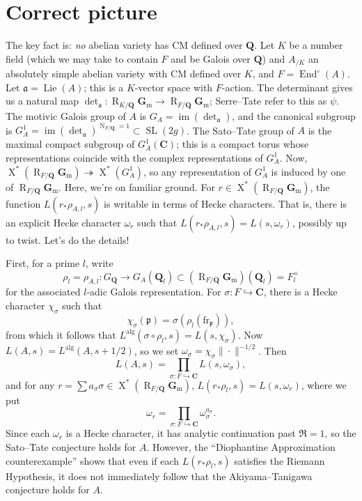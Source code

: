 \documentclass{article}
\DeclareMathOperator{\End}{End}
\DeclareMathOperator{\im}{im}
\DeclareMathOperator{\Lie}{Lie}
\DeclareMathOperator{\N}{N}
\DeclareMathOperator{\R}{R}
\DeclareMathOperator{\SL}{SL}
\DeclareMathOperator{\X}{X}
\newcommand{\bC}{\mathbf{C}}
\newcommand{\Gm}{\mathbf{G}_\mathrm{m}}
\newcommand{\bQ}{\mathbf{Q}}
\newcommand{\fa}{\mathfrak{a}}
\newcommand{\fp}{\mathfrak{p}}
\newcommand{\alg}{\mathrm{alg}}
\newcommand{\frob}{\mathrm{fr}}
\begin{document}
\section{Correct picture}

The key fact is: \emph{no} abelian variety has CM defined over $\bQ$. Let 
$K$ be a number field (which we may take to contain $F$ and be Galois over 
$\bQ$) and $A_{/K}$ an absolutely simple abelian variety with CM defined over 
$K$, and $F = \End^\circ(A)$. Let $\fa = \Lie(A)$; this is a $K$-vector space 
with $F$-action. The determinant gives us a natural map 
$\det_\fa\colon \R_{K/\bQ} \Gm \to \R_{F/\bQ} \Gm$; Serre--Tate refer to this 
as $\psi$. The motivic Galois group of $A$ is $G_A = \im(\det_\fa)$, and the 
canonical subgroup is $G_A^1 = \im(\det_\fa)^{\N_{F/\bQ} = 1}\subset \SL(2g)$. 
The Sato--Tate group of $A$ is the maximal compact subgroup of $G_A^1(\bC)$; 
this is a compact torus whose representations coincide with the complex 
representations of $G_A^1$. Now, 
$\X^\ast(\R_{F/\bQ} \Gm) \twoheadrightarrow \X^\ast(G_A^1)$, so any 
representation of $G_A^1$ is induced by one of $\R_{F/\bQ}\Gm$. Here, we're on 
familiar ground. For $r\in \X^\ast(\R_{F/\bQ}\Gm)$, the function 
$L(r_\ast \rho_{A,l},s)$ is writable in terms of Hecke characters. That is, 
there is an explicit Hecke character $\omega_r$ such that 
$L(r_\ast \rho_{A,l},s) = L(s,\omega_r)$, possibly up to twist. Let's do the 
details! 

First, for a prime $l$, write 
\[
	\rho_l = \rho_{A,l}\colon G_\bQ \to G_A(\bQ_l)\subset (\R_{F/\bQ} \Gm)(\bQ_l) = F_l^\times 
\]
for the associated $l$-adic Galois representation. For 
$\sigma\colon F\hookrightarrow \bC$, there is a Hecke character $\chi_\sigma$ 
such that 
\[
	\chi_\sigma(\fp) = \sigma(\rho_l(\frob_\fp)) ,
\]
from which it follows that $L^\alg(\sigma \circ \rho_l, s) = L(s,\chi_\sigma)$. 
Now $L(A,s) = L^\alg(A,s+1/2)$, so we set 
$\omega_\sigma = \chi_\sigma \|\cdot\|^{-1/2}$. Then 
\[
	L(A,s) = \prod_{\sigma\colon F\hookrightarrow \bC} L(s,\omega_\sigma) ,
\]
and for any $r = \sum a_\sigma \sigma \in \X^\ast(\R_{F/\bQ} \Gm)$, 
$L(r_\ast \rho_l,s) = L(s,\omega_r)$, where we put 
\[
	\omega_r = \prod_{\sigma\colon F\hookrightarrow \bC} \omega_\sigma^{a_\sigma} .
\]
Since each $\omega_r$ is a Hecke character, it has analytic continuation past 
$\Re = 1$, so the Sato--Tate conjecture holds for $A$. However, the 
``Diophantine Approximation counterexample'' shows that even if each 
$L(r_\ast \rho_l,s)$ satisfies the Riemann Hypothesis, it does not immediately 
follow that the Akiyama--Tanigawa conjecture holds for $A$. 
\end{document}

